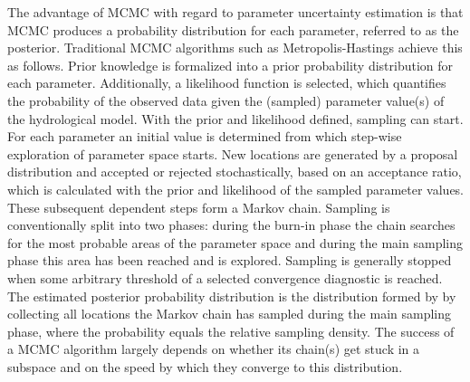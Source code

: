 The advantage of MCMC with regard to parameter uncertainty estimation is that MCMC produces a probability distribution for each parameter, referred to as the posterior. Traditional MCMC algorithms such as Metropolis-Hastings achieve this as follows. Prior knowledge is formalized into a prior probability distribution for each parameter. Additionally, a likelihood function is selected, which quantifies the probability of the observed data given the (sampled) parameter value(s) of the hydrological model. 
With the prior and likelihood defined, sampling can start. 
For each parameter an initial value is determined from which step-wise exploration of parameter space starts. New locations are generated by a proposal distribution and accepted or rejected stochastically, based on an acceptance ratio, which is calculated with the prior and likelihood of the sampled parameter values. These subsequent dependent steps form a Markov chain. 
Sampling is conventionally split into two phases: during the burn-in phase the chain searches for the most probable areas of the parameter space and during the main sampling phase this area has been reached and is explored. Sampling is generally stopped when some arbitrary threshold of a selected convergence diagnostic is reached. The estimated posterior probability distribution is the distribution formed by by collecting all locations the Markov chain has sampled during the main sampling phase, where the probability equals the relative sampling density. The success of a MCMC algorithm largely depends on whether its chain(s) get stuck in a subspace and on the speed by which they converge to this distribution. %

